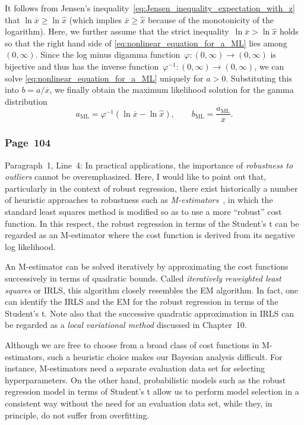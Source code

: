 \documentclass[12pt,a4paper]{article}
\newcommand{\erratum}[1]{%
\subsubsection*{#1}
\addcontentsline{toc}{subsection}{#1}}
\begin{document}
It follows from Jensen's inequality~\eqref{eq:Jensen_inequality_expectation_with_z}
that $\ln \overline{x} \geqslant \ln \widehat{x}$
(which implies $\overline{x} \geqslant \widehat{x}$ because of the monotonicity of the logarithm).
Here, we further assume that the strict inequality~$\ln \overline{x} > \ln \widehat{x}$ holds
so that the right hand side of \eqref{eq:nonlinear_equation_for_a_ML} lies
among $(0, \infty)$.
Since the log minus digamma function~$\varphi: (0, \infty) \to (0, \infty)$ is bijective
and thus has the inverse function~$\varphi^{-1}: (0, \infty) \to (0, \infty)$,
we can solve \eqref{eq:nonlinear_equation_for_a_ML} uniquely for $a > 0$.
Substituting this into $b = a/\overline{x}$,
we finally obtain the maximum likelihood solution for the gamma distribution
\begin{equation}
a_{\text{ML}} = \varphi^{-1}\left( \ln\overline{x} - \ln\widehat{x} \right), \qquad
b_{\text{ML}} = \frac{a_{\text{ML}}}{\overline{x}} .
\end{equation}


\erratum{Page~104}
Paragraph~1, Line~4:
In practical applications, the importance of
\emph{robustness to outliers} cannot be overemphasized.
Here, I would like to point out that,
particularly in the context of robust regression,
there exist historically a number of heuristic approaches to robustness such as
\emph{M-estimators}~\citep{Press:NR,Szeliski:ComputerVision},
in which the standard least squares method is modified so as to use
a more ``robust'' cost function.
In this respect, the robust regression in terms of the Student's t can be regarded as
an M-estimator where the cost function is derived from its negative log likelihood.

An M-estimator can be solved iteratively by approximating the cost functions successively
in terms of quadratic bounds.
Called \emph{iteratively reweighted least squares} or IRLS,
this algorithm closely resembles the EM algorithm.
In fact, one can identify the IRLS and the EM for
the robust regression in terms of the Student's t.
Note also that the successive quadratic approximation in IRLS can be regarded as
a \emph{local variational method} discussed in Chapter~10.

Although we are free to choose from a broad class of cost functions in M-estimators,
such a heuristic choice makes our Bayesian analysis difficult.
For instance, M-estimators need a separate evaluation data set for selecting hyperparameters.
On the other hand, probabilistic models such as
the robust regression model in terms of Student's t
allow us to perform model selection
in a consistent way without the need for an evaluation data set,
while they, in principle, do not suffer from overfitting.
\end{document}
